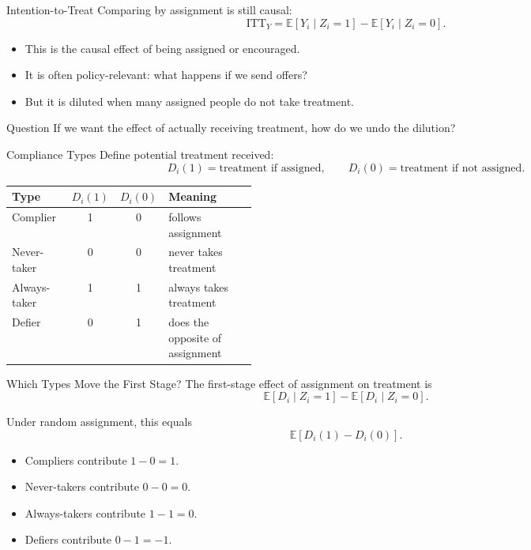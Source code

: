 \documentclass[11pt,aspectratio=169]{beamer}
\newcommand{\E}{\mathbb{E}}
\newcommand{\ITT}{\mathrm{ITT}}
\begin{document}
\begin{frame}{Intention-to-Treat}
  Comparing by assignment is still causal:
  \[
    \ITT_Y
    =
    \E[Y_i\mid Z_i=1]-\E[Y_i\mid Z_i=0].
  \]

  \begin{itemize}
    \item This is the causal effect of being assigned or encouraged.
    \item It is often policy-relevant: what happens if we send offers?
    \item But it is diluted when many assigned people do not take treatment.
  \end{itemize}

  \begin{block}{Question}
    If we want the effect of actually receiving treatment, how do we undo the dilution?
  \end{block}
\end{frame}

\begin{frame}{Compliance Types}
  Define potential treatment received:
  \[
    D_i(1)=\text{treatment if assigned},
    \qquad
    D_i(0)=\text{treatment if not assigned}.
  \]

  \begin{center}
  \begin{tabular}{lccp{0.36\linewidth}}
    \toprule
    Type & \(D_i(1)\) & \(D_i(0)\) & Meaning \\
    \midrule
    Complier & 1 & 0 & follows assignment \\
    Never-taker & 0 & 0 & never takes treatment \\
    Always-taker & 1 & 1 & always takes treatment \\
    Defier & 0 & 1 & does the opposite of assignment \\
    \bottomrule
  \end{tabular}
  \end{center}
\end{frame}

\begin{frame}{Which Types Move the First Stage?}
  The first-stage effect of assignment on treatment is
  \[
    \E[D_i\mid Z_i=1]-\E[D_i\mid Z_i=0].
  \]

  Under random assignment, this equals
  \[
    \E[D_i(1)-D_i(0)].
  \]

  \begin{itemize}
    \item Compliers contribute \(1-0=1\).
    \item Never-takers contribute \(0-0=0\).
    \item Always-takers contribute \(1-1=0\).
    \item Defiers contribute \(0-1=-1\).
  \end{itemize}
\end{frame}
\end{document}
